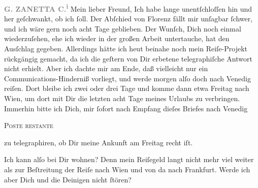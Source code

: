 \pstart
           \textcolor{gray}{\textbf{G. ZANETTA C.\textsuperscript{i}}}\pend
           \vspace{0.5em}
\pstart
           Mein lieber Freund, Ich habe lange unentſchloſſen hin
               und her geſchwankt, ob ich \label{K_L02889-1v}\label{K_L02889-1}{ }ſoll. Der Abſchied von Florenz fällt mir unſagbar{ }ſchwer, und ich wäre gern noch acht
               Tage geblieben. Der Wunſch, Dich noch einmal wiederzuſehen, ehe ich wieder in der
               großen Arbeit untertauche, hat \strikeout{\textcolor{gray}{f}} den Ausſchlag gegeben. Allerdings hätte ich heut beinahe noch mein Reiſe-Projekt rückgängig gemacht, da ich die geſtern von Dir erbetene telegraphiſche Antwort nicht
               erhielt. Aber ich dachte mir am Ende, daß vielleicht nur ein Communications-Hinderniß
               vorliegt, und werde morgen alſo doch nach Venedig reiſen. {\pb}Dort bleibe ich zwei oder drei Tage und komme dann etwa Freitag nach Wien, um dort mit Dir die
               letzten acht Tage meines Urlaubs zu verbringen. Immerhin bitte ich Dich, mir{ }ſofort
               nach Empfang dieſes Briefes nach Venedig\begin{otherlanguage}{french}\textsc{Poste restante}\end{otherlanguage}{ }zu telegraphiren, ob Dir meine Ankunft am Freitag recht iſt.\pend
           
\pstart
           Ich kann alſo bei Dir wohnen? Denn mein Reiſegeld langt nicht mehr viel weiter als
               zur Beſtreitung der Reiſe nach Wien und von da
               nach Frankfurt. Werde ich aber Dich und die
               Deinigen nicht{ }ſtören?\pend
           
